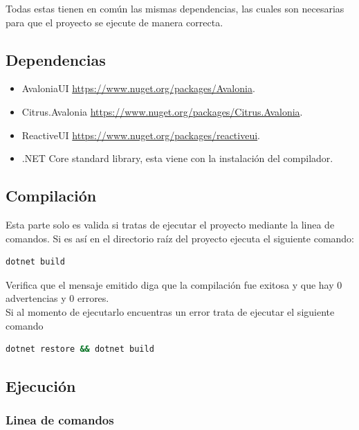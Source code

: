 \documentclass[12pt]{article}
\begin{document}
Todas estas tienen en común las mismas dependencias, las cuales son necesarias para que el proyecto se ejecute de
 manera correcta.

\subsection{Dependencias}

\begin{itemize}
	\item AvaloniaUI \url{https://www.nuget.org/packages/Avalonia}.
	\item Citrus.Avalonia \url{https://www.nuget.org/packages/Citrus.Avalonia}.
	\item ReactiveUI \url{https://www.nuget.org/packages/reactiveui}.
	\item .NET Core standard library, esta viene con la instalación del compilador.
\end{itemize}

\subsection{Compilación}

Esta parte solo es valida si tratas de ejecutar el proyecto mediante la linea de comandos.
 Si es así en el directorio raíz del proyecto ejecuta el siguiente comando:

\begin{lstlisting}[language=bash, xleftmargin=.4\textwidth]
dotnet build
\end{lstlisting}

Verifica que el mensaje emitido diga que la compilación fue exitosa y que hay 0 advertencias y 0 errores. \\

Si al momento de ejecutarlo encuentras un error trata de ejecutar el siguiente comando

\begin{lstlisting}[language=bash,xleftmargin=.2\textwidth]
dotnet restore && dotnet build
\end{lstlisting}

\subsection{Ejecución}

\subsubsection{Linea de comandos}
\end{document}
